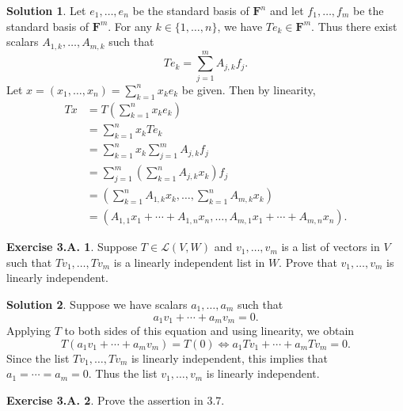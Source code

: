 \documentclass[12pt]{article}
\theoremstyle{definition}
\theoremstyle{exercise}
\newtheorem{exercise}{Exercise 3.A.}
\theoremstyle{solution}
\newtheorem*{solution}{Solution}
\newcommand{\lmap}{\mathcal{L}}
\newcommand{\F}{\mathbf{F}}
\begin{document}
\begin{solution}
    Let \( e_1, \ldots, e_n \) be the standard basis of \( \F^n \) and let \( f_1, \ldots, f_m \) be the standard basis of \( \F^m \). For any \( k \in \{ 1, \ldots, n \} \), we have \( T e_k \in \F^m \). Thus there exist scalars \( A_{1,k}, \ldots, A_{m,k} \) such that
    \[
        T e_k = \sum_{j=1}^m A_{j,k} f_j.
    \]
    Let \( x = (x_1, \ldots, x_n) = \sum_{k=1}^n x_k e_k \) be given. Then by linearity,
    \begin{align*}
        T x &= T \left( \sum_{k=1}^n x_k e_k \right) \\
        &= \sum_{k=1}^n x_k T e_k \\
        &= \sum_{k=1}^n x_k \sum_{j=1}^m A_{j,k} f_j \\
        &= \sum_{j=1}^m \left( \sum_{k=1}^n A_{j,k} x_k \right) f_j \\
        &= \left( \sum_{k=1}^n A_{1,k} x_k, \ldots, \sum_{k=1}^n A_{m,k} x_k \right) \\
        &= (A_{1,1} x_1 + \cdots + A_{1,n} x_n, \ldots, A_{m,1} x_1 + \cdots + A_{m,n} x_n).
    \end{align*}
\end{solution}

\begin{exercise}
\label{ex:4}
    Suppose \( T \in \lmap(V, W) \) and \( v_1, \ldots, v_m \) is a list of vectors in \( V \) such that \( T v_1, \ldots, T v_m \) is a linearly independent list in \( W \). Prove that \( v_1, \ldots, v_m \) is linearly independent.
\end{exercise}

\begin{solution}
    Suppose we have scalars \( a_1, \ldots, a_m \) such that
    \[
        a_1 v_1 + \cdots + a_m v_m = 0.
    \]
    Applying \( T \) to both sides of this equation and using linearity, we obtain
    \[
        T(a_1 v_1 + \cdots + a_m v_m) = T(0) \iff a_1 T v_1 + \cdots + a_m T v_m = 0.
    \]
    Since the list \( T v_1, \ldots, T v_m \) is linearly independent, this implies that \( a_1 = \cdots = a_m = 0 \). Thus the list \( v_1, \ldots, v_m \) is linearly independent.
\end{solution}

\begin{exercise}
\label{ex:5}
    Prove the assertion in 3.7.
\end{exercise}
\end{document}
